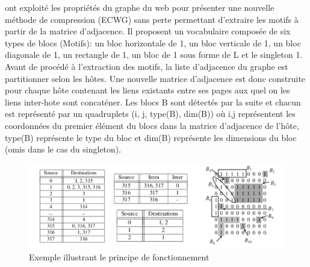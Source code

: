 
	\citep{asano2008efficient} ont exploité les propriétés du graphe du web pour présenter une nouvelle méthode de compression (ECWG) sans perte permettant d'extraire les motifs à partir de la matrice d'adjacence. Il proposent un vocabulaire composée de six types de blocs (Motifs): un bloc horizontale de 1, un bloc verticale de 1, un bloc diagonale de 1, un rectangle de 1, un bloc de 1 sous forme de L et le singleton 1. Avant de procédé à l'extraction des motifs, la liste d'adjacence du graphe est partitionner selon les hôtes. Une nouvelle matrice d'adjacence est donc construite pour chaque hôte contenant les liens existants entre ses pages aux quel on les liens inter-hote sont concaténer.
					Les blocs B sont détectés par la suite et chacun est représenté par un quadruplets (i, j, type(B), dim(B)) où i,j représentent les coordonnées du premier élément du blocs dans la matrice d'adjacence de l'hôte, type(B) représente le type du bloc et dim(B) représente les dimensions du bloc (omis dans le cas du singleton). 
					\begin{figure}[h]
					\includegraphics[scale=0.5]{ressources/image/inter_intra.png} 
					\caption{Exemple illustrant le principe de fonctionnement \citep{asano2008efficient}}
					\label{interIntra}
				\end{figure}